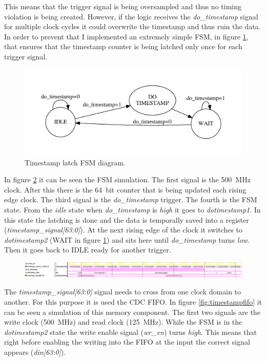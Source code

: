 This means that the trigger signal is being oversampled and thus no timing violation is being created.
However, if the logic receives the \textit{do\_timestamp} signal for multiple clock cycles it could overwrite the timestamp and thus ruin the data.
In order to prevent that I implemented an extremely simple FSM, in figure \ref{fig:timestampFSM}, that ensures that the timestamp counter is being latched only once for each trigger signal.
\begin{figure}[H]
	\centering
	\includegraphics[width=0.85\linewidth]{FSMdiagrams/timestampFSM.pdf}
	\caption{Timestamp latch FSM diagram.}
	\label{fig:timestampFSM}
\end{figure}
\noindent In figure \ref{fig:timestampfsm} it can be seen the FSM simulation. The first signal is the 500~MHz clock. After this there is the 64~bit counter that is being updated each rising edge clock. The third signal is the \textit{do\_timestamp} trigger. The fourth is the FSM state.
From the \textit{idle} state when \textit{do\_timestamp} is \textit{high} it goes to \textit{dotimestamp1}. In this state the latching is done and the data is temporally saved into a register (\textit{timestamp\_signal[63:0]}). At the next rising edge of the clock it switches to \textit{dotimestamp2} (WAIT in figure \ref{fig:timestampFSM}) and sits here until \textit{do\_timestamp} turns \textit{low}. Then it goes back to IDLE ready for another trigger.
\begin{figure}[H]
	\centering
	\includegraphics[width=1.0\linewidth]{IMG/ch4/TIMESTAMPsimulations/TIMESTAMPFSM}
	\caption{}
	\label{fig:timestampfsm}
\end{figure}
\noindent The \textit{timestamp\_signal[63:0]} signal needs to cross from one clock domain to another. For this purpose it is used the CDC FIFO.
In figure \ref{fig:timestampfifo} it can be seen a simulation of this memory component. 
The first two signals are the write clock (500~MHz) and read clock (125~MHz). While the FSM is in the \textit{dotimestamp2} state the write enable signal (\textit{wr\_en}) turns \textit{high}. This means that right before enabling the writing into the FIFO at the input the correct signal appears (\textit{din[63:0]}). 
